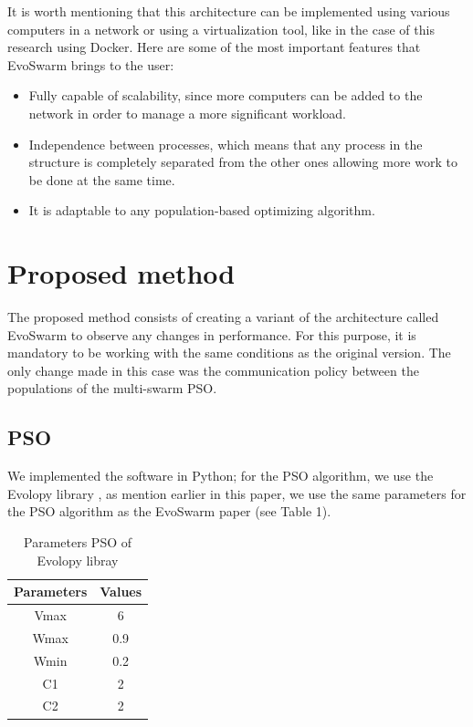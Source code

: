 \documentclass[runningheads]{llncs}
\begin{document}
It is worth mentioning that this architecture can be implemented using various computers in a network or using a virtualization tool, like in the case of this research using Docker. Here are some of the most important features that EvoSwarm brings to the user:

\begin{itemize}
    \item Fully capable of scalability, since more computers can be added to the network in order to manage a more significant workload.
    \item Independence between processes, which means that any process in the structure is completely separated from the other ones allowing more work to be done at the same time.
    \item It is adaptable to any population-based optimizing algorithm.
\end{itemize}


\section{Proposed method}

The proposed method consists of creating a variant of the architecture called EvoSwarm to observe any changes in performance. For this purpose, it is mandatory to be working with the same conditions as the original version. The only change made in this case was the communication policy between the populations of the multi-swarm PSO.

\subsection{PSO}
We implemented the software in Python; for the PSO algorithm, we use the Evolopy library \cite{b19}, as mention earlier in this paper, we use the same parameters for the PSO algorithm as the EvoSwarm paper (see Table 1).

\begin{table}[h!]
\centering
\caption{Parameters PSO of Evolopy libray}
\begin{tabular}{|c c|} 
 \hline
 Parameters & Values  \\ [0.5ex] 
 \hline\hline
 Vmax & 6 \\ 
 Wmax & 0.9 \\
 Wmin & 0.2 \\
C1 & 2 \\
C2 & 2 \\[0.5ex]
 \hline
\end{tabular}
\label{table:1}
\end{table}
\end{document}
